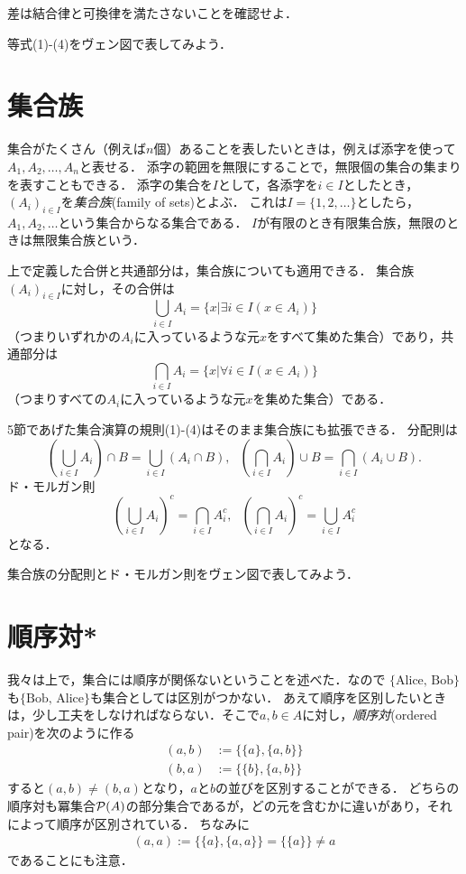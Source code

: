 \documentclass[11pt,a4paper]{jsarticle}
\begin{document}
\begin{exercise}
差は結合律と可換律を満たさないことを確認せよ．
\end{exercise}


\begin{exercise}
等式(1)-(4)をヴェン図で表してみよう．
\end{exercise}



\section{集合族}
集合がたくさん（例えば$n$個）あることを表したいときは，例えば添字を使って$A_1, A_2, \dots, A_n$と表せる．
添字の範囲を無限にすることで，無限個の集合の集まりを表すこともできる．
添字の集合を$I$として，各添字を$i \in I$としたとき，$(A_i)_{i\in I}$を\emph{集合族}(family of sets)とよぶ．
これは$I = \{1, 2,  \dots\}$としたら，$A_1, A_2, \dots$という集合からなる集合である．
$I$が有限のとき有限集合族，無限のときは無限集合族という．

上で定義した合併と共通部分は，集合族についても適用できる．
集合族$(A_i)_{i\in I}$に対し，その合併は
\[
 \bigcup_{i \in I} A_i = \{ x | \exists i \in I (x \in A_i) \}
\]
（つまりいずれかの$A_i$に入っているような元$x$をすべて集めた集合）であり，共通部分は
\[
 \bigcap_{i \in I} A_i = \{ x | \forall i \in I (x \in A_i) \}
\]
（つまりすべての$A_i$に入っているような元$x$を集めた集合）である．

5節であげた集合演算の規則(1)-(4)はそのまま集合族にも拡張できる．
分配則は
\[
 \left( \bigcup_{i \in I} A_i \right) \cap B = \bigcup_{i \in I} \left( A_i  \cap B \right) , \ \ \ 
 \left( \bigcap_{i \in I} A_i \right) \cup B = \bigcap_{i \in I} \left( A_i  \cup B \right). 
\]
ド・モルガン則
\[
 \left( \bigcup_{i \in I} A_i \right)^c = \bigcap_{i \in I} A_i^c, \ \ \ 
 \left( \bigcap_{i \in I} A_i \right)^c = \bigcup_{i \in I} A_i^c
\]
となる．

\begin{exercise}
集合族の分配則とド・モルガン則をヴェン図で表してみよう．
\end{exercise} 




\section{順序対*}
我々は上で，集合には順序が関係ないということを述べた．なので $\{\text{Alice, Bob}\}$も$\{\text{Bob, Alice}\}$も集合としては区別がつかない．
あえて順序を区別したいときは，少し工夫をしなければならない．そこで$a, b \in A$に対し，\emph{順序対}(ordered pair)を次のように作る
\begin{align*}
 (a, b) &:= \{ \{a\}, \{a, b\} \} \\
 (b, a) &:= \{ \{b\}, \{a, b\} \} 
\end{align*}
すると$(a,b) \neq (b,a)$となり，$a$と$b$の並びを区別することができる．
どちらの順序対も冪集合$\mathcal{P}(A)$の部分集合であるが，どの元を含むかに違いがあり，それによって順序が区別されている．
ちなみに
\begin{align*}
 (a, a) := \{ \{a\}, \{a, a\} \} = \{ \{a\} \} \neq a 
\end{align*}
であることにも注意．
\end{document}

